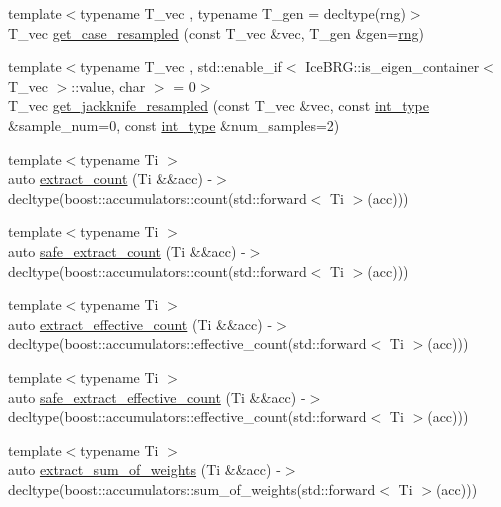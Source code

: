 \begin{DoxyCompactItemize}
\item 
{\footnotesize template$<$typename T\+\_\+vec , typename T\+\_\+gen  = decltype(rng)$>$ }\\T\+\_\+vec \hyperlink{namespaceIceBRG_ae922ec487b3be5021f32c3df392cc8da}{get\+\_\+case\+\_\+resampled} (const T\+\_\+vec \&vec, T\+\_\+gen \&gen=\hyperlink{namespaceIceBRG_a43349d2fe56e49b46f2da45c2472137d}{rng})
\item 
{\footnotesize template$<$typename T\+\_\+vec , std\+::enable\+\_\+if$<$ Ice\+B\+R\+G\+::is\+\_\+eigen\+\_\+container$<$ T\+\_\+vec $>$\+::value, char $>$  = 0$>$ }\\T\+\_\+vec \hyperlink{namespaceIceBRG_afc154bf91798fed11ad39165acd952bb}{get\+\_\+jackknife\+\_\+resampled} (const T\+\_\+vec \&vec, const \hyperlink{lib_2IceBRG__main_2common_8h_ac4de9d9335536ac22821171deec8d39e}{int\+\_\+type} \&sample\+\_\+num=0, const \hyperlink{lib_2IceBRG__main_2common_8h_ac4de9d9335536ac22821171deec8d39e}{int\+\_\+type} \&num\+\_\+samples=2)
\item 
{\footnotesize template$<$typename Ti $>$ }\\auto \hyperlink{namespaceIceBRG_a75d35aa72ae3736b68382f3ca42657e0}{extract\+\_\+count} (Ti \&\&acc) -\/$>$ decltype(boost\+::accumulators\+::count(std\+::forward$<$ Ti $>$(acc)))
\item 
{\footnotesize template$<$typename Ti $>$ }\\auto \hyperlink{namespaceIceBRG_a4f46efc43f2fc8d95db203182ef6fc32}{safe\+\_\+extract\+\_\+count} (Ti \&\&acc) -\/$>$ decltype(boost\+::accumulators\+::count(std\+::forward$<$ Ti $>$(acc)))
\item 
{\footnotesize template$<$typename Ti $>$ }\\auto \hyperlink{namespaceIceBRG_ad807205719340ed71a2514f6e77a1fd3}{extract\+\_\+effective\+\_\+count} (Ti \&\&acc) -\/$>$ decltype(boost\+::accumulators\+::effective\+\_\+count(std\+::forward$<$ Ti $>$(acc)))
\item 
{\footnotesize template$<$typename Ti $>$ }\\auto \hyperlink{namespaceIceBRG_a5c808a5e225d0768a50bd712ef7426c7}{safe\+\_\+extract\+\_\+effective\+\_\+count} (Ti \&\&acc) -\/$>$ decltype(boost\+::accumulators\+::effective\+\_\+count(std\+::forward$<$ Ti $>$(acc)))
\item 
{\footnotesize template$<$typename Ti $>$ }\\auto \hyperlink{namespaceIceBRG_a4bf198a273d57a21710dead846cf269c}{extract\+\_\+sum\+\_\+of\+\_\+weights} (Ti \&\&acc) -\/$>$ decltype(boost\+::accumulators\+::sum\+\_\+of\+\_\+weights(std\+::forward$<$ Ti $>$(acc)))

\end{DoxyCompactItemize}
